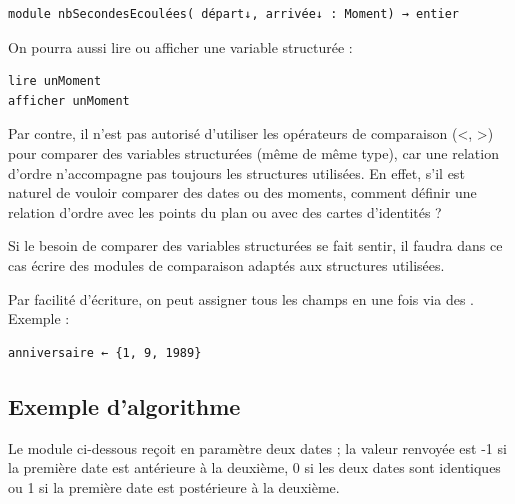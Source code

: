\documentclass[11pt,a4paper]{article}
\begin{document}
            \par
        \begin{verbatim}
module nbSecondesEcoulées( départ↓, arrivée↓ : Moment) → entier
      \end{verbatim}
		    On pourra aussi lire ou afficher une variable structur\'ee :
      
            \par
        \begin{verbatim}
lire unMoment
afficher unMoment
      \end{verbatim}
		    Par contre, il n'est pas autoris\'e d'utiliser les op\'erateurs de comparaison (<, >) pour comparer 
		    des variables structur\'ees (m\^eme de m\^eme type), car une relation d'ordre n'accompagne
        pas toujours les structures utilis\'ees. En effet, s'il est naturel de vouloir comparer des dates
        ou des moments, comment d\'efinir une relation d'ordre avec les points du plan ou avec des
        cartes d'identit\'es ?
      
            \par
        
        Si le besoin de comparer des variables structur\'ees se fait sentir, il faudra dans ce cas \'ecrire
        des modules de comparaison adapt\'es aux structures utilis\'ees.
      
            \par
        
        Par facilit\'e d'\'ecriture, on peut assigner tous les champs en une fois via des \guillemotleft  {} \guillemotright . Exemple :
      
            \par
        \begin{verbatim}
anniversaire ← {1, 9, 1989}
      \end{verbatim}\subsection{Exemple d'algorithme}
		    Le module ci-dessous re\c coit en param\`etre deux dates ; la valeur renvoy\'ee est -1 si la premi\`ere
        date est ant\'erieure \`a la deuxi\`eme, 0 si les deux dates sont identiques ou 1 si la premi\`ere date
        est post\'erieure \`a la deuxi\`eme.
      
\end{document}
